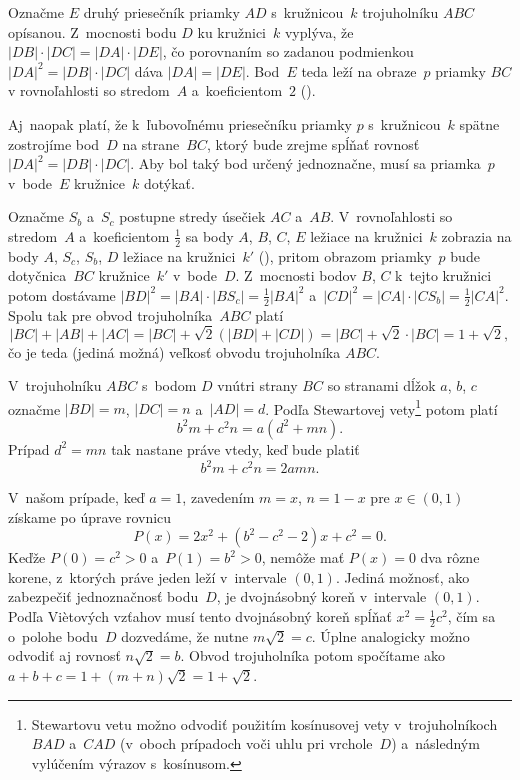 {%
Označme $E$ druhý priesečník priamky $AD$
s~kružnicou~$k$ trojuholníku $ABC$ opísanou. Z~mocnosti bodu $D$ ku kružnici~$k$
vyplýva, že $|DB| \cdot |DC|=|DA| \cdot |DE|$, čo porovnaním so zadanou
podmienkou $|DA|^2=|DB| \cdot |DC|$ dáva $|DA|=|DE|$. Bod~$E$ teda leží
na obraze~$p$ priamky $BC$ v rovnoľahlosti so stredom~$A$
a~koeficientom~$2$ (\obr).

Aj~naopak platí, že k~ľubovoľnému priesečníku priamky $p$ s~kružnicou~$k$ spätne zostrojíme
bod~$D$ na strane~$BC$, ktorý bude zrejme spĺňať rovnosť $|DA|^2={|DB| \cdot |DC|}$.
Aby bol taký bod určený jednoznačne, musí sa priamka~$p$ v~bode~$E$ kružnice~$k$ dotýkať.
%

Označme $S_b$ a~$S_c$ postupne stredy úsečiek $AC$ a~$AB$. V~rovnoľahlosti so stredom~$A$ a~koeficientom $\frac{1}{2}$ sa
body $A$, $B$, $C$, $E$ ležiace na kružnici~$k$
zobrazia na body $A$, $S_c$, $S_b$, $D$ ležiace na kružnici~$k'$ (\obr),
pritom obrazom priamky~$p$ bude dotyčnica~$BC$ kružnice~$k'$ v~bode~$D$.
Z~mocnosti bodov $B$, $C$ k~tejto kružnici
potom dostávame $|BD|^2=|BA| \cdot |BS_c|=\frac12 |BA|^2$ a~$|CD|^2=|CA|
\cdot |CS_b|=\frac12 |CA|^2$. Spolu tak pre obvod trojuholníka~$ABC$ platí
$$
|BC|+|AB|+|AC|=|BC|+\sqrt{2}(|BD|+|CD|)
=|BC|+\sqrt{2} \cdot|BC|=1+\sqrt{2},
$$
čo je teda (jediná možná) veľkosť obvodu trojuholníka $ABC$.

\ineriesenie
V~trojuholníku $ABC$ s~bodom $D$
vnútri strany $BC$ so stranami dĺžok $a$, $b$, $c$ označme $|BD| = m$,
$|DC| = n$ a~$|AD| = d$. Podľa Stewartovej vety\footnote{Stewartovu
vetu možno odvodiť použitím kosínusovej vety v~trojuholníkoch $BAD$ a~$CAD$
(v~oboch prípadoch voči uhlu pri vrchole~$D$) a~následným vylúčením výrazov
s~kosínusom.} potom platí
$$
b^2m + c^2n = a(d^2+mn).
$$
Prípad $d^2 = mn$ tak nastane práve vtedy, keď bude platiť
$$
b^2m + c^2n = 2amn.
$$

V~našom prípade, keď $a= 1$, zavedením $m = x$, $n = 1-x$ pre $x \in
(0,1)$ získame po úprave rovnicu
$$
P(x) = 2x^2 + (b^2-c^2-2)x + c^2 = 0.
$$
Keďže $P(0) = c^2 > 0$ a~$P(1) = b^2 > 0$, nemôže mať $P(x) = 0$ dva
rôzne korene, z~ktorých práve jeden leží v~intervale $(0,1)$. Jediná
možnosť, ako zabezpečiť jednoznačnosť bodu~$D$, je dvojnásobný koreň
v~intervale $(0,1)$. Podľa Vi\`etových vzťahov musí tento dvojnásobný koreň
spĺňať $x^2 = \frac12 c^2$, čím sa o~polohe bodu~$D$ dozvedáme, že
nutne $m\sqrt{2}= c$. Úplne analogicky možno odvodiť aj rovnosť $n\sqrt{2}=b$.
Obvod trojuholníka potom spočítame ako $a+b+c = 1 +(m+n)\sqrt{2} = 1 + \sqrt{2}$.
}

